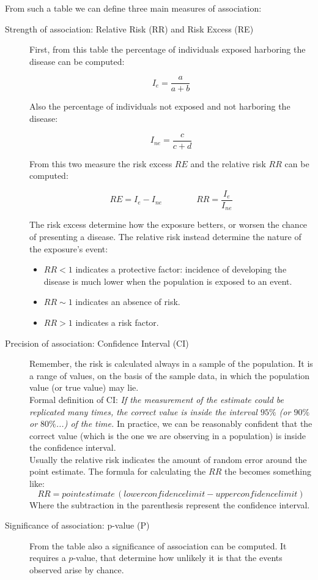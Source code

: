 		From such a table we can define three main measures of association:
		
		
		\begin{description}
		\item[Strength of association: Relative Risk (RR) and Risk Excess (RE)]
			
			First, from this table the percentage of individuals exposed harboring the disease can be computed:

		$$I_e = \frac{a}{a+b}$$

		Also the percentage of individuals not exposed and not harboring the disease:

		$$I_{ne} = \frac{c}{c+d}$$

		From this two measure the risk excess $RE$ and the relative risk $RR$ can be computed:

		$$RE = I_e - I_{ne} \qquad\qquad RR= \frac{I_e}{I_{ne}}$$

		The risk excess determine how the exposure betters, or worsen the chance of presenting a disease.
		The relative risk instead determine the nature of the exposure's event:

			\begin{itemize}
				\item $RR<1$ indicates a protective factor: incidence of developing the disease is much lower when the population is exposed to an event.
				\item $RR \sim 1$ indicates an absence of risk.
				\item $RR> 1$ indicates a risk factor.
			\end{itemize}
	
		
		\item[Precision of association: Confidence Interval (CI)]
		Remember, the risk is calculated always in a sample of the population.
		It is a range of values, on the basis of the sample data, in which the population value (or true value) may lie.
		\\
		Formal definition of CI: \textit{If the measurement of the estimate could be replicated many times, the correct value is inside the interval $95\%$ (or $90\%$ or $80\%$...) of the time.}
		In practice, we can be reasonably confident that the correct value (which is the one we are observing in a population) is inside the confidence interval.
		\\
		Usually the relative risk indicates the amount of random error around the point estimate.
		The formula for calculating the $RR$ the becomes something like:
			$$RR = point estimate \,(lower confidence limit - upper confidence limit)$$
			Where the subtraction in the parenthesis represent the confidence interval.
			
		\item[Significance of association: p-value (P)]
		From the table also a significance of association can be computed.
			It requires a $p$-value, that determine how unlikely it is that the events observed arise by chance.
		
		\end{description}
			

